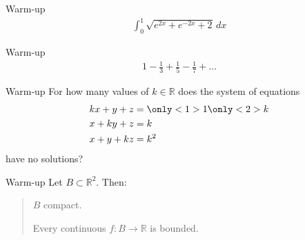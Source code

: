\documentclass[onepage, 12pt]{beamer}
\providecommand{\IR}{\mathbb{R}}
\newcommand{\from}{\colon}
\begin{document}


%         
%             




\begin{frame}[t]{\color{gray} Warm-up}{}
    \begin{align*}
        \int_0^1
        \sqrt{
            e^{2x} + e^{-2x} + 2
        } \, dx
    \end{align*}
\end{frame}




\begin{frame}[t]{\color{gray} Warm-up}{}
    \begin{align*}
        1 - \frac13 + \frac15 - \frac17 + \ldots
    \end{align*}
\end{frame}





\begin{frame}[t]{\color{gray} Warm-up}{}
    For how many values of $k \in \IR$ 
    does the system of equations
    \begin{align*}
        k x + y + z & = \only<1>{1} \only<2>{k} \\
        x + k y + z & = k \\
        x + y + k z & = k^2
    \end{align*}
    have no solutions?
\end{frame}




\begin{frame}[t]{\color{gray} Warm-up}{}
    Let $B \subset \IR^2$.
	Then:
	\begin{quote}
		\normalfont
		$B$ compact.
		
		{\only<1>{$\Rightarrow$}}
		{\only<2>{$\Leftarrow$}}
		
		Every continuous $f \from B \to \IR$ is bounded.
	\end{quote}
\end{frame}
\end{document}
